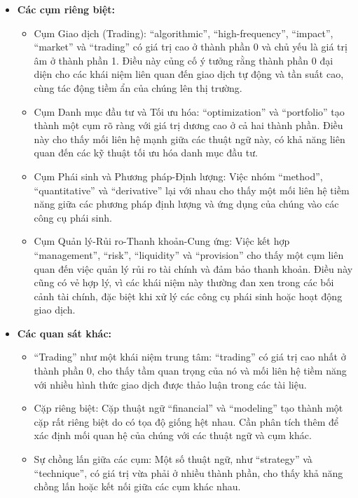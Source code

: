 \begin{itemize}
  \item \textbf{Các cụm riêng biệt:}
  \begin{itemize}
    \item Cụm Giao dịch (Trading): ``algorithmic'', ``high-frequency'', ``impact'', ``market'' và ``trading'' có giá trị cao ở thành phần 0 và chủ yếu là giá trị âm ở thành phần 1. Điều này củng cố ý tưởng rằng thành phần 0 đại diện cho các khái niệm liên quan đến giao dịch tự động và tần suất cao, cùng tác động tiềm ẩn của chúng lên thị trường.

    \item Cụm Danh mục đầu tư và Tối ưu hóa: ``optimization'' và ``portfolio'' tạo thành một cụm rõ ràng với giá trị dương cao ở cả hai thành phần. Điều này cho thấy mối liên hệ mạnh giữa các thuật ngữ này, có khả năng liên quan đến các kỹ thuật tối ưu hóa danh mục đầu tư.

    \item Cụm Phái sinh và Phương pháp-Định lượng: Việc nhóm ``method'', ``quantitative'' và ``derivative'' lại với nhau cho thấy một mối liên hệ tiềm năng giữa các phương pháp định lượng và ứng dụng của chúng vào các công cụ phái sinh.

    \item Cụm Quản lý-Rủi ro-Thanh khoản-Cung ứng: Việc kết hợp ``management'', ``risk'', ``liquidity'' và ``provision'' cho thấy một cụm liên quan đến việc quản lý rủi ro tài chính và đảm bảo thanh khoản. Điều này cũng có vẻ hợp lý, vì các khái niệm này thường đan xen trong các bối cảnh tài chính, đặc biệt khi xử lý các công cụ phái sinh hoặc hoạt động giao dịch.
  \end{itemize}

  \item \textbf{Các quan sát khác:}
  \begin{itemize}
    \item ``Trading'' như một khái niệm trung tâm: ``trading'' có giá trị cao nhất ở thành phần 0, cho thấy tầm quan trọng của nó và mối liên hệ tiềm năng với nhiều hình thức giao dịch được thảo luận trong các tài liệu.
    \item Cặp riêng biệt: Cặp thuật ngữ ``financial'' và ``modeling'' tạo thành một cặp rất riêng biệt do có tọa độ giống hệt nhau. Cần phân tích thêm để xác định mối quan hệ của chúng với các thuật ngữ và cụm khác.
    \item Sự chồng lấn giữa các cụm: Một số thuật ngữ, như ``strategy'' và ``technique'', có giá trị vừa phải ở nhiều thành phần, cho thấy khả năng chồng lấn hoặc kết nối giữa các cụm khác nhau.
  \end{itemize}
\end{itemize}

